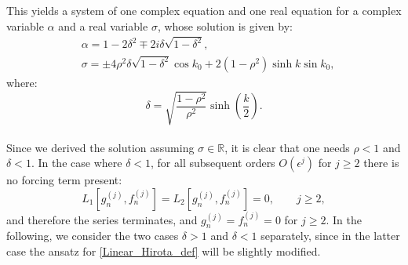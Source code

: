 \documentclass{article}
\def\Real{\mathbb{R}}
\begin{document}
This yields a system of one complex equation and one real equation for a complex variable $\alpha$ and a real variable $\sigma$, whose solution is given by:
\begin{equation}\label{alpha_sigma}
    \begin{split}
    &\alpha=1-2\delta^2\mp 2i\delta\sqrt{1-\delta^2},\\
    &\sigma=\pm 4\rho^2\delta\sqrt{1-\delta^2}\cos k_0+2(1-\rho^2)\sinh k\sin k_0,
    \end{split}
\end{equation}
where:
\begin{equation}
    \delta=\sqrt{\frac{1-\rho^2}{\rho^2}}\sinh\left(\frac{k}{2}\right).
\end{equation}\\
Since we derived the solution assuming $\sigma\in\Real$, it is clear that one needs $\rho<1$ and $\delta<1$. 
In the case where $\delta<1$,  for all subsequent orders $O(\epsilon^j)$ for $j\geq 2$ there is no forcing term present:
\begin{equation}
L_1[g_n^{(j)},f_n^{(j)}]=L_2[g_n^{(j)},f_n^{(j)}]=0, \qquad j\ge 2,
\end{equation}
and therefore the series terminates, and  $g_n^{(j)}=f_n^{(j)}=0$ for $j\geq 2$.
In the following, we consider the two cases $\delta>1$ and $\delta<1$ separately, since in the latter case the ansatz for \eqref{Linear_Hirota_def} will be slightly modified.
\end{document}

